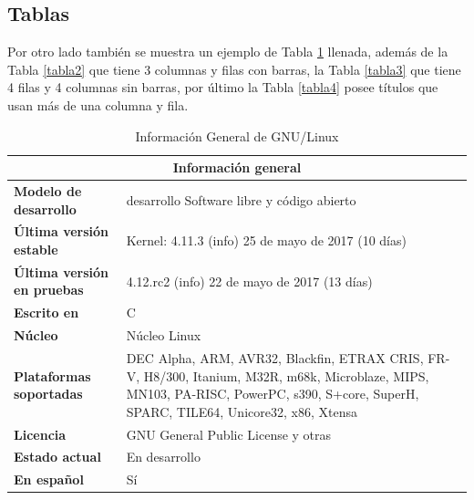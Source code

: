 \begin{definir}\label{definir1}
\lipsum[1] %
\end{definir}

\begin{prueba}\label{prueba1}
\lipsum[1] %
\end{prueba}

\begin{demo} \label{demo1}
\lipsum[1] %
\end{demo}

\begin{obs}\label{obs1}
\lipsum[1] %
\end{obs}

\subsection{Tablas}
Por otro lado también se muestra un ejemplo de Tabla \ref{tabla1} llenada, además de la Tabla \ref{tabla2} que tiene 3 columnas y filas con barras, la Tabla \ref{tabla3} que tiene 4 filas y 4 columnas sin barras, por último la Tabla \ref{tabla4} posee títulos que usan más de una columna y fila. 

\begin{table}[hbt]
\begin{center}
\begin{tabular}{|l|p{10cm}|}\hline
\multicolumn{2}{|c|}{\textbf{Información general}}\\
\hline
\textbf{Modelo de desarrollo}&desarrollo	Software libre y código abierto\\
\textbf{Última versión estable}&Kernel: 4.11.3 (info) 25 de mayo de 2017 (10 días)\\
\textbf{Última versión en pruebas}&	4.12.rc2 (info) 22 de mayo de 2017 (13 días)\\
\textbf{Escrito en}&	C\\
\textbf{Núcleo}&	Núcleo Linux\\
\textbf{Plataformas soportadas}	& DEC Alpha, ARM, AVR32, Blackfin, ETRAX CRIS, FR-V, H8/300, Itanium, M32R, m68k, Microblaze, MIPS, MN103, PA-RISC, PowerPC, s390, S+core, SuperH, SPARC, TILE64, Unicore32, x86, Xtensa\\
\textbf{Licencia}	&GNU General Public License y otras\\
\textbf{Estado actual}	&En desarrollo\\
\textbf{En español}	&Sí\\
\hline
\end{tabular}
\end{center}
\caption{Información General de GNU/Linux}
\label{tabla1}
\end{table}



